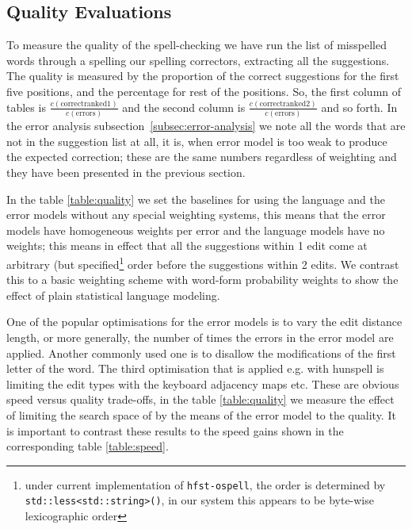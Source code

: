 \documentclass[a4paper,12pt]{article}
\begin{document}
\subsection{Quality Evaluations}

To measure the quality of the spell-checking we have run the list of misspelled
words through a spelling our spelling correctors, extracting all the
suggestions.  The quality is measured by the proportion of the correct
suggestions for the first five positions, and the percentage for rest of the
positions. So, the first column of tables is $\frac{c(\mathrm{correct ranked
1})}{c(\mathrm{errors})}$ and the second column is $\frac{c(\mathrm{correct
ranked 2})}{c(\mathrm{errors})}$ and so forth.  In the error analysis
subsection~\ref{subsec:error-analysis} we note all the words that are not in
the suggestion list at all, it is, when error model is too weak to produce the
expected correction; these are the same numbers regardless of weighting and
they have been presented in the previous section.

In the table \ref{table:quality} we set the baselines for using the
language and the error models without any special weighting systems, this means
that the error models have homogeneous weights per error and the language
models have no weights; this means in effect that all the suggestions within 1
edit come at arbitrary (but specified\footnote{under current implementation of
\texttt{hfst-ospell}, the order is determined by
\texttt{std::less<std::string>()}, in our system this appears to be byte-wise
lexicographic order} order before the suggestions within 2 edits.  We contrast
this to a basic weighting scheme with word-form probability weights to show the
effect of plain statistical language modeling.

One of the popular optimisations for the error models is to vary the edit
distance length, or more generally, the number of times the errors in the error
model are applied.  Another commonly used one is to disallow the modifications
of the first letter of the word. The third optimisation that is applied e.g.
with hunspell is limiting the edit types with the keyboard adjacency maps etc.
These are obvious speed versus quality trade-offs, in the table
\ref{table:quality} we measure the effect of limiting the search
space of by the means of the error model to the quality. It is important to
contrast these results to the speed gains shown in the corresponding table
\ref{table:speed}.
\end{document}
